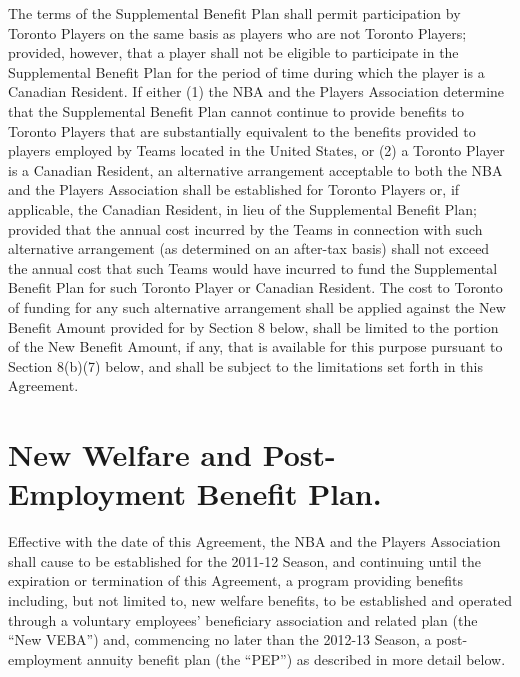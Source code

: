 \documentclass[
]{book}
\begin{document}
\begin{enumerate}
  The terms of the Supplemental Benefit Plan shall permit participation by Toronto Players on the same basis as players who are not Toronto Players; provided, however, that a player shall not be eligible to participate in the Supplemental Benefit Plan for the period of time during which the player is a Canadian Resident. If either (1) the NBA and the Players Association determine that the Supplemental Benefit Plan cannot continue to provide benefits to Toronto Players that are substantially equivalent to the benefits provided to players employed by Teams located in the United States, or (2) a Toronto Player is a Canadian Resident, an alternative arrangement acceptable to both the NBA and the Players Association shall be established for Toronto Players or, if applicable, the Canadian Resident, in lieu of the Supplemental Benefit Plan; provided that the annual cost incurred by the Teams in connection with such alternative arrangement (as determined on an after-tax basis) shall not exceed the annual cost that such Teams would have incurred to fund the Supplemental Benefit Plan for such Toronto Player or Canadian Resident. The cost to Toronto of funding for any such alternative arrangement shall be applied against the New Benefit Amount provided for by Section 8 below, shall be limited to the portion of the New Benefit Amount, if any, that is available for this purpose pursuant to Section 8(b)(7) below, and shall be subject to the limitations set forth in this Agreement.
\end{enumerate}

\hypertarget{new-welfare-and-post-employment-benefit-plan.}{%
\section{New Welfare and Post-Employment Benefit Plan.}\label{new-welfare-and-post-employment-benefit-plan.}}

Effective with the date of this Agreement, the NBA and the Players Association shall cause to be established for the 2011-12 Season, and continuing until the expiration or termination of this Agreement, a program providing benefits including, but not limited to, new welfare benefits, to be established and operated through a voluntary employees' beneficiary association and related plan (the ``New VEBA'') and, commencing no later than the 2012-13 Season, a post-employment annuity benefit plan (the ``PEP'') as described in more detail below.
\end{document}
